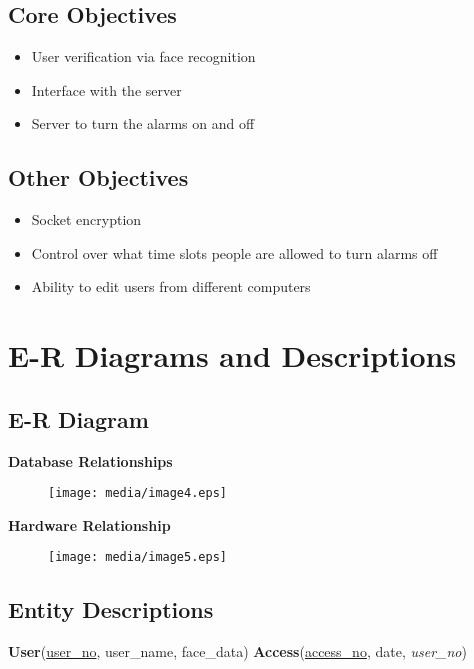\documentclass[12pt,a4paper]{report}
\begin{document}
\subsection{Core Objectives}\label{section:_Toc370402510}
\begin{itemize}
\item User verification via face recognition
\item Interface with the server
\item Server to turn the alarms on and off
\end{itemize}
\subsection{Other Objectives}\label{section:_Toc370402511}
\begin{itemize}
\item Socket encryption
\item Control over what time slots people are allowed to turn alarms off
\item Ability to edit users from different computers
\end{itemize}
\section{E-R Diagrams and Descriptions}\label{section:_Toc370402512}
\subsection{E-R Diagram}\label{section:_Toc370402513}
\textbf{Database Relationships}

\begin{figure}[H]

\texttt{[image: media/image4.eps]}
\end{figure}


\textbf{Hardware Relationship}

\begin{figure}[H]

\texttt{[image: media/image5.eps]}
\end{figure}


\subsection{Entity Descriptions}%

\textbf{User}(\underline{user\_no}, user\_name, face\_data) \newline
\textbf{Access}(\underline{access\_no}, date, \textit{user\_no})
\end{document}
